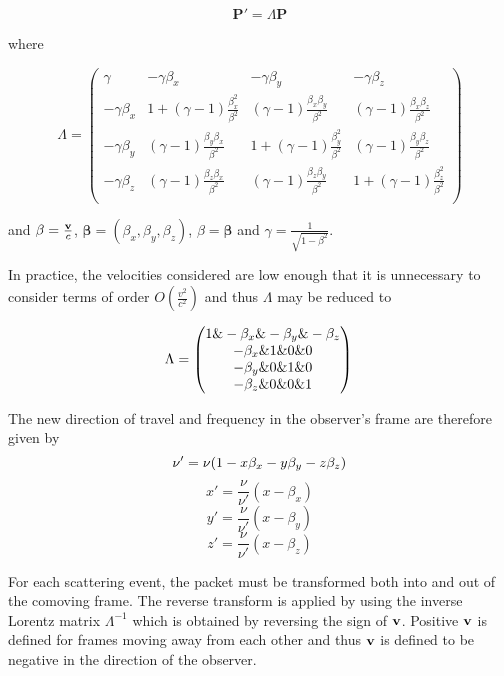 \documentclass[useAMS,usenatbib]{mn2e}
\begin{document}
\begin{equation}
	\mathbf{P'}=\Lambda \mathbf{P}	
\end{equation}

\noindent where 

\[
	{\Lambda}=
	 \begin{pmatrix} 
	  \gamma & -\gamma \beta_x & -\gamma \beta_y & -\gamma \beta_z \\
	 -\gamma \beta_x & 1+(\gamma-1)\frac{\beta_x^2}{\beta^2} & (\gamma-1)\frac{\beta_x \beta_y}{\beta^2} & (\gamma-1)\frac{\beta_x \beta_z}{\beta^2} \\
	 -\gamma \beta_y  & (\gamma-1)\frac{\beta_y \beta_x}{\beta^2} & 1+(\gamma-1)\frac{\beta_y^2}{\beta^2} & (\gamma-1)\frac{\beta_y \beta_z}{\beta^2} \\
	 -\gamma \beta_z & (\gamma-1)\frac{\beta_z \beta_x}{\beta^2} & (\gamma-1)\frac{\beta_z \beta_y}{\beta^2} & 1+(\gamma-1)\frac{\beta_z^2}{\beta^2} \\
	 \end{pmatrix}
\]

 \noindent and $\mathbf{\beta}=\frac{{\bf{v}}}{c}$,   $\mathbf{\beta}=(\beta_x,\beta_y,\beta_z)$,   $\beta=\mathbf{\beta}$ and $\gamma = \frac{1}{\sqrt{1-\beta^2}}$.


In practice, the velocities considered are low enough that it is unnecessary to consider terms of order $O(\frac{v^2}{c^2})$ and thus ${\Lambda}$ may be reduced to

\begin{equation}
	{\Lambda}=
	 \begin{pmatrix} 
	 1 \& - \beta_x \& - \beta_y \& - \beta_z \\
	- \beta_x \& 1 \& 0 \& 0 \\
	- \beta_y  \& 0 \& 1 \& 0\\
	- \beta_z \& 0 \& 0 \& 1 \\
	 \end{pmatrix}
	 \\
\end{equation}

\noindent The new direction of travel and frequency in the observer's frame are therefore given by  
\begin{equation}
\nu'=\nu(1-x\beta_x-y\beta_y-z\beta_z) \\
\end{equation}
\[
x'=\frac{\nu}{\nu'}(x-\beta_x) 
\]
\[
y'=\frac{\nu}{\nu'}(x-\beta_y) 
\]
\[
z'=\frac{\nu}{\nu'}(x-\beta_z) 
\]


For each scattering event, the packet must be transformed both into and out of the comoving frame. The reverse transform is applied by using the inverse Lorentz matrix $\Lambda^{-1}$ which is obtained by reversing the sign of $\bf{v}$.  Positive $\bf{v}$ is defined for frames moving away from each other and thus $\bf{v}$ is defined to be negative in the direction of the observer.

\bsp

\label{lastpage}
\end{document}

